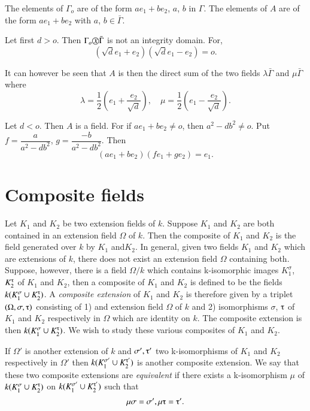 The elements of $\Gamma_o$ are of the form $ae_1 + be_2$, $a$, $b$ in
$\Gamma$. The elements of $A$ are of the form $ae_1 + be_2$ with
$a$, $b  \in \bar{\Gamma}$. 

Let first $d > o$. Then $\Gamma_o  \text{\textcircled{$x$}}
\bar{\Gamma}$ is not an integrity domain. For,  
$$
( \sqrt{d}  e_1 + e_2 )  (\sqrt{d}  e_1 - e_2) = o.
$$

It can however be seen that $A$ is then the direct sum of the two
fields $\lambda \bar{\Gamma}$ and $\mu \bar{\Gamma}$ where 
$$
\lambda = \frac{1}{2} (e_1 + \frac{e_2}{\sqrt{d}}),   \quad \mu = 
\frac{1}{2} (e_1 - \frac{e_2}{\sqrt{d}}). 
$$

Let $d < o$. Then $A$ is a field. For if $a  e_1 + b  e_2 \neq o$,
then $a^2 - d  b^2 \neq o$. Put $f = \dfrac{a}{a^2 - db^2}$, $g =
\dfrac{-b}{a^2 - db^2}$. Then 
$$
(a  e_1 + b   e_2)  (f  e_1 + g  e_2) = e_1.
$$


\section{Composite fields}\label{c5:s2} %

Let $K_1$ and $K_2$ be two extension fields of $k$. Suppose $K_1$ and
$K_2$ are both contained in an extension field $\Omega$ of $k$. Then
the composite of $K_1$ and $K_2$ is the field generated over $k$ by
$K_1$ and\pageoriginale $K_2$. In general, given two fields $K_1$ and
$K_2$ which 
are extensions of $k$, there does not exist an extension field
$\Omega$ containing both. Suppose, however, there is a field
$\Omega/k$ which contains k-isomorphic images $K^\sigma_1$, $K^\tauup_2$
of $K_1$ and $K_2$, then a composite of $K_1$ and $K_2$ is defined to
be the fields $k(K^\sigma_1  \cup  K^\tauup_2)$. A \textit{composite
  extension} of $K_1$ and $K_2$ is therefore given by a triplet
$(\Omega, \sigma, \tauup )$ consisting of 1) and extension field
$\Omega$ of $k$ and 2) isomorphisms $\sigma$, $\tauup$ of $K_1$ and
$K_2$ respectively in $\Omega$ which are identity on $k$. The
composite extension is then $k(K^\sigma_1  \cup K^\tauup_2)$. We wish
to study these various composites of $K_1$ and $K_2$. 

If $\Omega'$ is another extension of $k$ and $\sigma', \tauup'$  two
k-isomorphisms of $K_1$ and $K_2$ respectively in $\Omega'$ then
$k(K^{\sigma'}_1  \cup  K^{\tauup'}_2)$ is another composite
extension. We say that these two composite extensions are
\textit{equivalent} if there exists a k-isomorphism $\mu$ of
$k(K^\sigma_1  \cup  K^{\tauup}_2)$ on $k(K^{\sigma'}_1  \cup
K^{\tauup'}_2)$ such that  
$$
\mu  \sigma = \sigma' , \mu  \tauup = \tauup'.
$$

